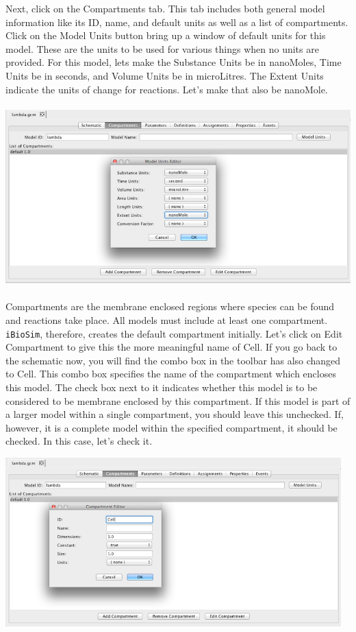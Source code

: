\documentclass[titlepage,11pt]{article}
\begin{document}
Next, click on the Compartments tab.  This tab includes both general model information like its ID, name, and default units as well as a list of compartments.  Click on the Model Units button bring up a window of default units for this model.  These are the units to be used for various things when no units are provided.  For this model, lets make the Substance Units be in nanoMoles, Time Units be in seconds, and Volume Units be in microLitres.  The Extent Units indicate the units of change for reactions.  Let's make that also be nanoMole.

\begin{center}
\includegraphics[height=70mm]{screenshots/ModelUnits}
\end{center}

Compartments are the membrane enclosed regions where species can be found and reactions take place.  All models must include at least one compartment.  {\tt iBioSim}, therefore, creates the default compartment initially.  Let's click on Edit Compartment to give this the more meaningful name of Cell.  If you go back to the schematic now, you will find the combo box in the toolbar has also changed to Cell.  This combo box specifies the name of the compartment which encloses this model.  The check box next to it indicates whether this model is to be considered to be membrane enclosed by this compartment.  If this model is part of a larger model within a single compartment, you should leave this unchecked.  If, however, it is a complete model within the specified compartment, it should be checked.  In this case, let's check it.

\begin{center}
\includegraphics[height=65mm]{screenshots/compartment}
\end{center}
\end{document}
